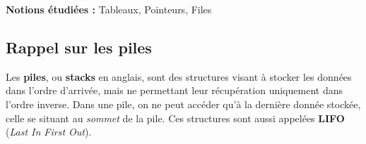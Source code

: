 \newcommand{\defaultparindent}{\parindent}
\setlength{\parindent}{0pt}				%




\textbf{Notions étudiées :} Tableaux, Pointeurs, Files\\


\subsection{Rappel sur les piles}

\bigskip

Les \textbf{piles}, ou \textbf{stacks} en anglais, sont des structures visant à stocker les données dans l'ordre d'arrivée, mais ne permettant leur récupération uniquement dans l'ordre inverse.
Dans une pile, on ne peut accéder qu'à la dernière donnée stockée, celle se situant au \textit{sommet} de la pile.
Ces structures sont aussi appelées \textbf{LIFO} (\textit{Last In First Out}).\\

